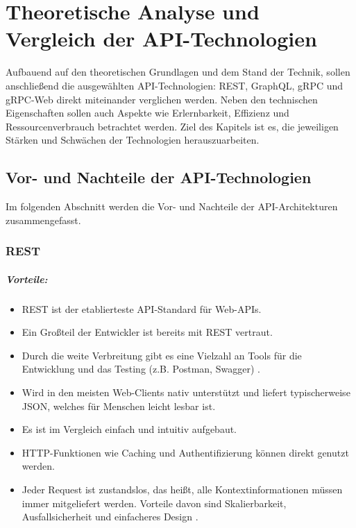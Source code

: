 \chapter{Theoretische Analyse und Vergleich der API-Technologien}
\label{chap:intro}
\chapterstart
Aufbauend auf den theoretischen Grundlagen und dem Stand der Technik, sollen anschließend die ausgewählten API-Technologien: REST, GraphQL, gRPC und gRPC-Web direkt miteinander verglichen werden. Neben den technischen Eigenschaften sollen auch Aspekte wie Erlernbarkeit, Effizienz und Ressourcenverbrauch betrachtet werden. Ziel des Kapitels ist es, die jeweiligen Stärken und Schwächen der Technologien herauszuarbeiten.

\section{Vor- und Nachteile der API-Technologien}
Im folgenden Abschnitt werden die Vor- und Nachteile der API-Architekturen zusammengefasst.
\subsection{REST}

\paragraph{Vorteile:}
\begin{itemize}
	\item REST ist der etablierteste API-Standard für Web-APIs.
	\item Ein Großteil der Entwickler ist bereits mit REST vertraut.
	\item Durch die weite Verbreitung gibt es eine Vielzahl an Tools für die Entwicklung und das Testing (z.B. Postman, Swagger) \parencite{postman2022, postman2023}.
	\item Wird in den meisten Web-Clients nativ unterstützt und liefert typischerweise JSON, welches für Menschen leicht lesbar ist.
	\item Es ist im Vergleich einfach und intuitiv aufgebaut.
	\item HTTP-Funktionen wie Caching und Authentifizierung können direkt genutzt werden.
	\item Jeder Request ist zustandslos, das heißt, alle Kontextinformationen müssen immer mitgeliefert werden. Vorteile davon sind Skalierbarkeit, Ausfallsicherheit und einfacheres Design \parencite{fielding2000rest}. 
\end{itemize}

